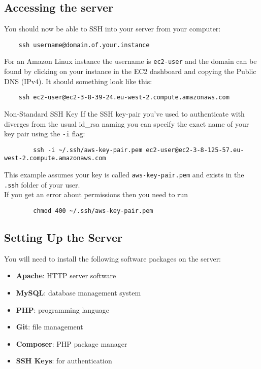 \subsection{Accessing the server}

You should now be able to SSH into your server from your computer:

\begin{verbatim}
    ssh username@domain.of.your.instance
\end{verbatim}

For an Amazon Linux instance the username is \texttt{ec2-user} and the domain can be found by clicking on your instance in the EC2 dashboard and copying the Public DNS (IPv4). It should something look like this:

\begin{verbatim}
    ssh ec2-user@ec2-3-8-39-24.eu-west-2.compute.amazonaws.com
\end{verbatim}

\begin{infobox}{Non-Standard SSH Key}
    If the SSH key-pair you've used to authenticate with diverges from the usual id\_rsa naming you can specify the exact name of your key pair using the \texttt{-i} flag:

    \begin{verbatim}
        ssh -i ~/.ssh/aws-key-pair.pem ec2-user@ec2-3-8-125-57.eu-west-2.compute.amazonaws.com
    \end{verbatim}

    This example assumes your key is called \texttt{aws-key-pair.pem} and exists in the \texttt{.ssh} folder of your user.
    \\
    
    If you get an error about permissions then you need to run
    
    \begin{verbatim}
        chmod 400 ~/.ssh/aws-key-pair.pem
    \end{verbatim}
\end{infobox}

\pagebreak

\subsection{Setting Up the Server}

You will need to install the following software packages on the server:

\begin{itemize}
    \item \textbf{Apache}: HTTP server software
    \item \textbf{MySQL}: database management system
    \item \textbf{PHP}: programming language
    \item \textbf{Git}: file management
    \item \textbf{Composer}: PHP package manager
    \item \textbf{SSH Keys}: for authentication
\end{itemize}

